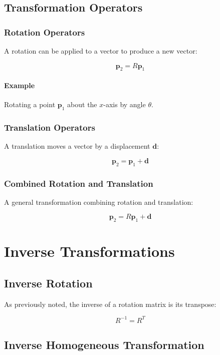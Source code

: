\documentclass{article}
\begin{document}
\subsection{Transformation Operators}

\subsubsection{Rotation Operators}

A rotation can be applied to a vector to produce a new vector:

$$
\mathbf{p}_2 = R \mathbf{p}_1
$$

\paragraph{Example}

Rotating a point $\mathbf{p}_1$ about the $x$-axis by angle $\theta$.

\subsubsection{Translation Operators}

A translation moves a vector by a displacement $\mathbf{d}$:

$$
\mathbf{p}_2 = \mathbf{p}_1 + \mathbf{d}
$$

\subsubsection{Combined Rotation and Translation}

A general transformation combining rotation and translation:

$$
\mathbf{p}_2 = R \mathbf{p}_1 + \mathbf{d}
$$

\section{Inverse Transformations}

\subsection{Inverse Rotation}

As previously noted, the inverse of a rotation matrix is its transpose:

$$
R^{-1} = R^T
$$

\subsection{Inverse Homogeneous Transformation}
\end{document}
